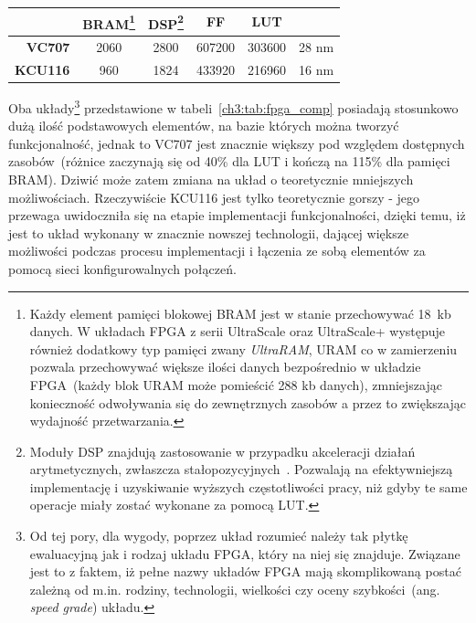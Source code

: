 \begin{enumerate}
\begin{savenotes}
\begin{table}[H]
\begin{tabular}{|r|c|c|c|c|c|}
                  & BRAM\footnote{Każdy element pamięci blokowej BRAM jest w stanie przechowywać 18~kb danych. W układach FPGA z serii UltraScale oraz UltraScale+ występuje również dodatkowy typ pamięci zwany \textit{UltraRAM}, URAM co w zamierzeniu pozwala przechowywać większe ilości danych bezpośrednio w układzie FPGA~(każdy blok URAM może pomieścić 288 kb danych), zmniejszając konieczność odwoływania się do zewnętrznych zasobów a przez to zwiększając wydajność przetwarzania. }      & DSP\footnote{Moduły DSP znajdują zastosowanie w przypadku akceleracji działań arytmetycznych, zwłaszcza stałopozycyjnych~\cite{DSP48E1}\cite{DSP48E2}. Pozwalają na efektywniejszą implementację i uzyskiwanie wyższych częstotliwości pracy, niż gdyby te same operacje miały zostać wykonane za pomocą LUT.}       & FF         & LUT        &                                                                                 \\ \hline
\textbf{VC707}    & 2060      & 2800      & 607200     & 303600     & 28 nm                                                                   \\ \hline
\textbf{KCU116}   & 960       & 1824      & 433920     & 216960     & 16 nm                                                                \\ \hline
\end{tabular}
\end{table}
\end{savenotes}
Oba układy\footnote{Od tej pory, dla wygody, poprzez układ rozumieć należy tak płytkę ewaluacyjną jak i rodzaj układu FPGA, który na niej się znajduje. Związane jest to z faktem, iż pełne nazwy układów FPGA mają skomplikowaną postać zależną od m.in. rodziny, technologii, wielkości czy oceny szybkości~(ang. \textit{speed grade}) układu.} przedstawione w tabeli~\ref{ch3:tab:fpga_comp} posiadają stosunkowo dużą ilość podstawowych elementów, na bazie których można tworzyć funkcjonalność, jednak to VC707 jest znacznie większy pod względem dostępnych zasobów~(różnice zaczynają się od 40\% dla LUT i kończą na 115\% dla pamięci BRAM). Dziwić może zatem zmiana na układ o teoretycznie mniejszych możliwościach. Rzeczywiście KCU116 jest tylko teoretycznie gorszy - jego przewaga uwidoczniła się na etapie implementacji funkcjonalności, dzięki temu, iż jest to układ wykonany w znacznie nowszej technologii, dającej większe możliwości podczas procesu implementacji i łączenia ze sobą elementów za pomocą sieci konfigurowalnych połączeń.

\end{enumerate}
